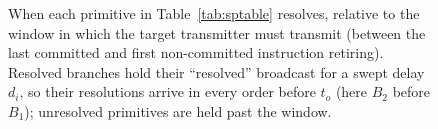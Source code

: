 \begin{figure}[t]
  \caption{When each primitive in Table~\ref{tab:sptable} resolves, relative to the window in which the target transmitter must transmit (between the last committed and first non-committed instruction retiring). Resolved branches hold their ``resolved'' broadcast for a swept delay $d_i$, so their resolutions arrive in every order before $t_o$ (here $B_2$ before $B_1$); unresolved primitives are held past the window.}
  \label{fig:resolutiontiming}
\end{figure}
